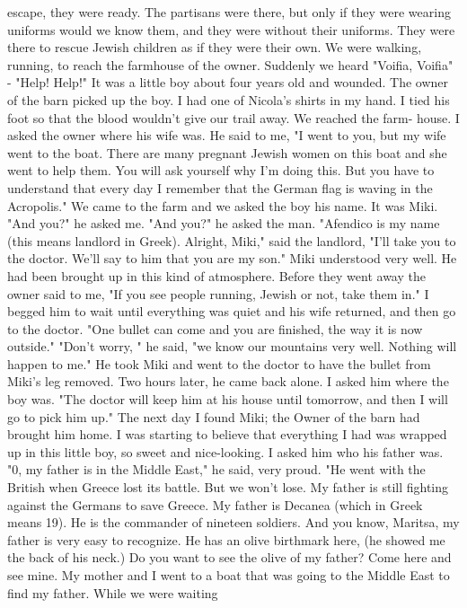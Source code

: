 escape, they were ready. The partisans were there, but only if they 
were wearing uniforms would we know them, and they were without their 
uniforms. They were there to rescue Jewish children as if they were 
their own. 
We were walking, running, to reach the farmhouse of the owner. 
Suddenly we heard "Voifia, Voifia" - "Help! Help!" It was a little 
boy about four years old and wounded. The owner of the barn picked 
up the boy. I had one of Nicola's shirts in my hand. I tied his foot 
so that the blood wouldn't give our trail away. We reached the farm-
house. I asked the owner where his wife was. He said to me, "I went 
to you, but my wife went to the boat. There are many pregnant Jewish 
women on this boat and she went to help them. You will ask yourself 
why I'm doing this. But you have to understand that every day I 
remember that the German flag is waving in the Acropolis." 
We came to the farm and we asked the boy his name. It was Miki. 
"And you?" he asked me. "And you?" he asked the man. "Afendico is 
my name (this means landlord in Greek). Alright, Miki," said the landlord, 
"I'll take you to the doctor. We'll say to him that you are my son." 
Miki understood very well. He had been brought up in this kind of 
atmosphere. Before they went away the owner said to me, "If you see 
people running, Jewish or not, take them in." I begged him to wait 
until everything was quiet and his wife returned, and then go to the 
doctor. "One bullet can come and you are finished, the way it is now 
outside." "Don't worry, " he said, "we know our mountains very well. 
Nothing will happen to me." He took Miki and went to the doctor to 
have the bullet from Miki's leg removed. Two hours later, he came 
back alone. I asked him where the boy was. 
"The doctor will keep him at his house until tomorrow, and then 
I will go to pick him up." The next day I found Miki; the Owner of 
the barn had brought him home. I was starting to believe that everything I had was wrapped up in this little boy, so sweet and nice-looking. I asked him who his father was. "0, my father is in the Middle East," he said, very proud. "He went with the British when Greece 
lost its battle. But we won't lose. My father is still fighting against 
the Germans to save Greece. My father is Decanea (which in Greek means 
19). He is the commander of nineteen soldiers. And you know, Maritsa, 
my father is very easy to recognize. He has an olive birthmark here, 
(he showed me the back of his neck.) Do you want to see the olive of 
my father? Come here and see mine. My mother and I went to a boat that 
was going to the Middle East to find my father. While we were waiting 
